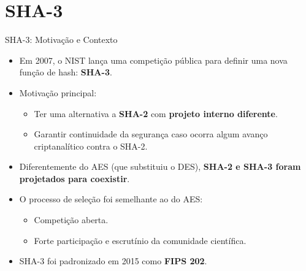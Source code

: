\documentclass{beamer}
\begin{document}
\section{SHA-3}

\begin{frame}{SHA-3: Motivação e Contexto}
  \begin{itemize}
    \item Em 2007, o NIST lança uma competição pública para definir uma nova função de hash: \textbf{SHA-3}.
    \item Motivação principal:
      \begin{itemize}
        \item Ter uma alternativa a \textbf{SHA-2} com \textbf{projeto interno diferente}.
        \item Garantir continuidade da segurança caso ocorra algum avanço criptanalítico contra o SHA-2.
      \end{itemize}
    \item Diferentemente do AES (que substituiu o DES), \textbf{SHA-2 e SHA-3 foram projetados para coexistir}.
    \item O processo de seleção foi semelhante ao do AES:
      \begin{itemize}
        \item Competição aberta.
        \item Forte participação e escrutínio da comunidade científica.
      \end{itemize}
    \item SHA-3 foi padronizado em 2015 como \textbf{FIPS 202}.
  \end{itemize}
\end{frame}
\end{document}
